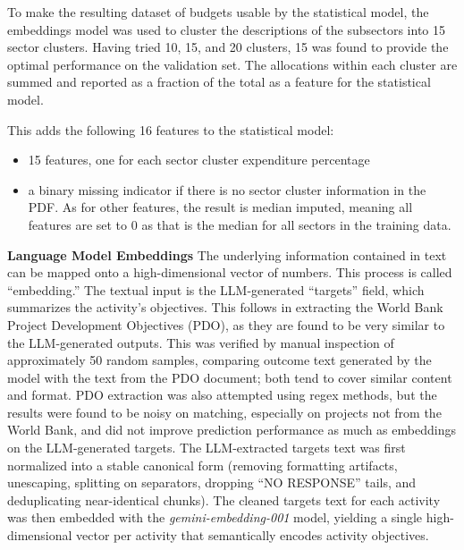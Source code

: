 \documentclass[12pt,a4paper]{article}
\let\citep\parencite
\begin{document}
To make the resulting dataset of budgets usable by the statistical model, the embeddings model was used to cluster the descriptions of the subsectors into 15 sector clusters. Having tried 10, 15, and 20 clusters, 15 was found to provide the optimal performance on the validation set. The allocations within each cluster are summed and reported as a fraction of the total as a feature for the statistical model.

This adds the following 16 features to the statistical model:
\begin{itemize}
  \item 15 features, one for each sector cluster expenditure percentage \citep{goldembergMindingGapAid2025}
  \item a binary missing indicator if there is no sector cluster information in the PDF. As for other features, the result is median imputed, meaning all features are set to 0 as that is the median for all sectors in the training data.
\end{itemize}

\textbf{Language Model Embeddings} \label{subsubsub:llmembeddingsumap}
The underlying information contained in text can be mapped onto a high-dimensional vector of numbers. This process is called ``embedding.'' The textual input is the LLM-generated ``targets'' field, which summarizes the activity's objectives. This follows \citep{goldembergMindingGapAid2025} in extracting the World Bank Project Development Objectives (PDO), as they are found to be very similar to the LLM-generated outputs. This was verified by manual inspection of approximately 50 random samples, comparing outcome text generated by the model with the text from the PDO document; both tend to cover similar content and format. PDO extraction was also attempted using regex methods, but the results were found to be noisy on matching, especially on projects not from the World Bank, and did not improve prediction performance as much as embeddings on the LLM-generated targets. The LLM-extracted targets text was first normalized into a stable canonical form (removing formatting artifacts, unescaping, splitting on separators, dropping “NO RESPONSE” tails, and deduplicating near-identical chunks). The cleaned targets text for each activity was then embedded with the \emph{gemini-embedding-001} model, yielding a single high-dimensional vector per activity that semantically encodes activity objectives.
\end{document}
